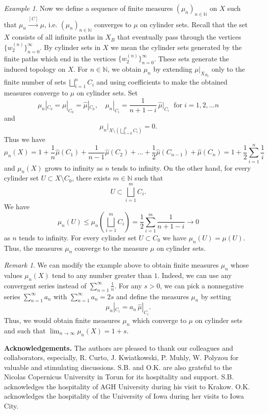 \documentclass[11pt,reqno]{amsart}
\theoremstyle{definition}
\theoremstyle{remark}
\newtheorem{example}[definition]{Example}
\newtheorem{remark}[definition]{Remark}
\theoremstyle{plain}
\def\wh{\widehat}
\newcommand{\N}{\mathbb N}
\numberwithin{equation}{section}
\begin{document}
\begin{example}
Now we define a sequence of finite measures $(\mu_n)_{n \in \N}$ on $X$ such that $\mu_n \xrightarrow{[C]} \mu$, i.e. $(\mu_n)_{n \in \N}$ converges to $\mu$ on cylinder sets. Recall that the set $X$ consists of all infinite paths in $X_B$ that eventually pass through the vertices $\{w_2^{(n)}\}_{n = 0}^{\infty}$. By cylinder sets in $X$ we mean the cylinder sets generated by the finite paths which end in the vertices $\{w_2^{(n)}\}_{n = 0}^{\infty}$. These sets generate the induced topology on $X$.
For $n \in \N$, we obtain $\mu_n$ by extending $\mu|_{X_{B_2}}$ only to the finite number of sets $\bigsqcup_{i = 1}^n C_i$ and using coefficients to make the obtained measures converge to $\mu$ on cylinder sets.
Set
$$
{\mu}_n|_{C_0} = {\mu}|_{C_0} = {\wh \mu}|_{C_0}, \quad
\mu_n|_{C_i} = \frac{1}{n + 1 - i} \, {\wh \mu}|_{C_i} \;
\mbox{ for } i = 1, 2 , \ldots n$$
and
$$
 \mu_n|_{X \setminus \left(\bigsqcup_{i = 0}^n C_i\right)} = 0.
$$
Thus we have 
$$
\mu_n(X) = 1 + \frac{1}{n} \wh \mu(C_{1}) + \frac{1}{n-1} \wh \mu(C_{2}) + \ldots + \frac{1}{2} \wh \mu(C_{n-1}) + \wh \mu(C_{n}) = 1 + \frac{1}{2}\sum_{i = 1}^{n} \frac{1}{i}
$$
and $\mu_n(X)$ grows to infinity as $n$ tends to infinity. On the other hand, for every cylinder set $U \subset X \setminus C_0$, there exists $m \in \mathbb{N}$ such that
$$
U \subset \bigsqcup_{i = 1}^m C_i.
$$
We have
$$
\mu_n(U) \leq \mu_n\left(\bigsqcup_{i = 1}^m C_i\right) = \frac{1}{2} \sum_{i = 1}^m  \frac{1}{n + 1 - i} \rightarrow 0
$$
as $n$ tends to infinity.
For every cylinder set $U \subset C_0$ we have $\mu_n(U) = \mu(U)$. Thus, the measures $\mu_n$ converge to the measure $\mu$ on cylinder sets. 
\end{example}

\begin{remark} We can modify the example above to obtain finite measures $\mu_n$ whose values $\mu_n(X)$ tend to any number greater than $1$. Indeed, we can use any convergent series instead of $\sum_{n = 1}^{\infty} \frac{1}{n}$. For any $s > 0$, we can pick a nonnegative series $\sum_{n = 1}^\infty a_n$ with $\sum_{n = 1}^\infty a_n= 2s$ and define the measures $\mu_n$ by setting
$$
\mu_n|_{C_i} = a_n \, {\wh \mu}|_{C_i}.
$$
Thus, we would obtain finite measures $\mu_n$ which converge to $\mu$ on cylinder sets and such that $\lim_{n \rightarrow \infty} \mu_n (X) = 1 + s$.
\end{remark}
\medskip

\textbf{Acknowledgements.} 
The authors are pleased to thank our colleagues and collaborators, especially, R. Curto, J. Kwiatkowski, P. Muhly, W. Polyzou for valuable and stimulating discussions. S.B. and O.K. are also grateful to the Nicolas Copernicus University in Torun for its hospitality and support. S.B. acknowledges the hospitality of AGH University during his visit to Krakow. O.K. acknowledges the hospitality of the University of Iowa during her visits to Iowa City.
\end{document}
